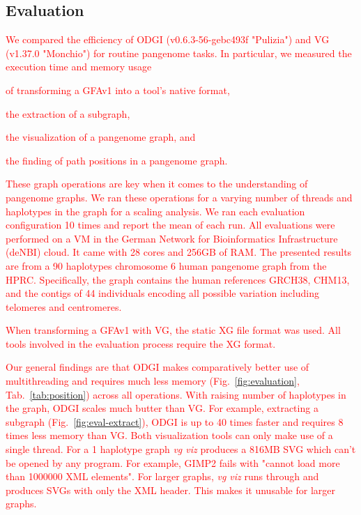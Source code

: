 \documentclass{bioinfo}
\newcommand{\REVIEWED}[1]{{\textcolor{Red}{#1}}}
\begin{document}
\vspace{0.22cm}

\subsection{Evaluation}
\label{Evaluation}

\REVIEWED{We compared the efficiency of ODGI (v0.6.3-56-gebc493f "Pulizia") and VG (v1.37.0 "Monchio") for routine pangenome tasks. In particular, we measured the execution time and memory usage}
\begin{inparaenum}[(i)]
	\item \REVIEWED{of transforming a GFAv1 into a tool's native format, }
	\item \REVIEWED{the extraction of a subgraph,}
	\item \REVIEWED{the visualization of a pangenome graph, and}
	\item \REVIEWED{the finding of path positions in a pangenome graph.}
\end{inparaenum}
\REVIEWED{These graph operations are key when it comes to the understanding of pangenome graphs. We ran these operations for a varying number of threads and haplotypes in the graph for a scaling analysis. We ran each evaluation configuration 10 times and report the mean of each run.
All evaluations were performed on a VM in the German Network for Bioinformatics Infrastructure (deNBI) cloud. It came with 28 cores and 256GB of RAM.
The presented results are from a 90 haplotypes chromosome 6 human pangenome graph from the HPRC. Specifically, the graph contains the human references GRCH38, CHM13, and the contigs of 44 individuals encoding all possible variation including telomeres and centromeres. }

\REVIEWED{When transforming a GFAv1 with VG, the static XG file format was used. All tools involved in the evaluation process require the XG format.}

\REVIEWED{Our general findings are that ODGI makes comparatively better use of multithreading and requires much less memory (Fig.~\ref{fig:evaluation}, Tab.~\ref{tab:position}) across all operations. With raising number of haplotypes in the graph, ODGI scales much butter than VG. For example, extracting a subgraph (Fig.~\ref{fig:eval-extract}), ODGI is up to 40 times faster and requires 8 times less memory than VG.
}
\REVIEWED{Both visualization tools can only make use of a single thread. For a 1 haplotype graph \textit{vg viz} produces a 816MB SVG which can't be opened by any program. For example, GIMP2 fails with "cannot load more than 1000000 XML elements". For larger graphs, \textit{vg viz} runs through and produces SVGs with only the XML header. This makes it unusable for larger graphs.}
\end{document}
